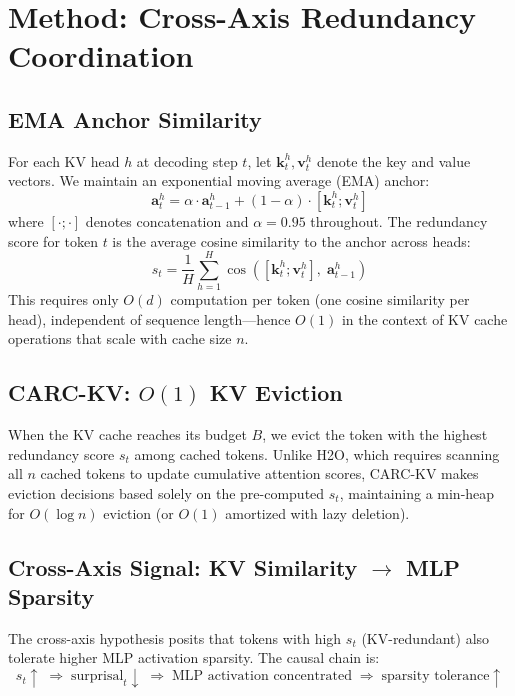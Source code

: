 \documentclass[11pt,a4paper]{article}
\begin{document}
\section{Method: Cross-Axis Redundancy Coordination}
\label{sec:method}

\subsection{EMA Anchor Similarity}
\label{sec:ema}

For each KV head $h$ at decoding step $t$, let $\mathbf{k}_t^h, \mathbf{v}_t^h$ denote the key and value vectors.
We maintain an exponential moving average (EMA) anchor:
\begin{equation}
    \mathbf{a}_t^h = \alpha \cdot \mathbf{a}_{t-1}^h + (1 - \alpha) \cdot [\mathbf{k}_t^h; \mathbf{v}_t^h]
\end{equation}
where $[\cdot;\cdot]$ denotes concatenation and $\alpha = 0.95$ throughout.
The redundancy score for token $t$ is the average cosine similarity to the anchor across heads:
\begin{equation}
    s_t = \frac{1}{H} \sum_{h=1}^{H} \cos\left([\mathbf{k}_t^h; \mathbf{v}_t^h],\; \mathbf{a}_{t-1}^h\right)
\end{equation}
This requires only $O(d)$ computation per token (one cosine similarity per head), independent of sequence length---hence $O(1)$ in the context of KV cache operations that scale with cache size $n$.

\subsection{CARC-KV: $O(1)$ KV Eviction}
\label{sec:carc-kv}

When the KV cache reaches its budget $B$, we evict the token with the highest redundancy score $s_t$ among cached tokens.
Unlike H2O, which requires scanning all $n$ cached tokens to update cumulative attention scores, CARC-KV makes eviction decisions based solely on the pre-computed $s_t$, maintaining a min-heap for $O(\log n)$ eviction (or $O(1)$ amortized with lazy deletion).

\subsection{Cross-Axis Signal: KV Similarity $\rightarrow$ MLP Sparsity}
\label{sec:cross-axis}

The cross-axis hypothesis posits that tokens with high $s_t$ (KV-redundant) also tolerate higher MLP activation sparsity.
The causal chain is:
\begin{equation}
    s_t \uparrow \;\Rightarrow\; \text{surprisal}_t \downarrow \;\Rightarrow\; \text{MLP activation concentrated} \;\Rightarrow\; \text{sparsity tolerance} \uparrow
\end{equation}
\end{document}
